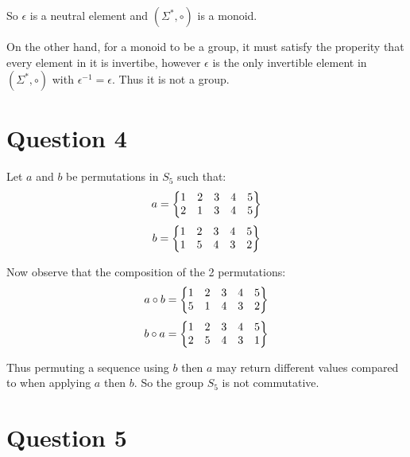 \documentclass{article}
\numberwithin{equation}{subsection}
\begin{document}
	So $\epsilon$ is a neutral element and $(\Sigma^*, \circ)$ is a monoid.

	\vspace{10pt}
	On the other hand, for a monoid to be a group, it must satisfy the properity that every element
	in it is invertibe, however $\epsilon$ is the only invertible element in $(\Sigma^*, \circ)$ with $\epsilon^{-1} = \epsilon$.
	Thus it is not a group.

	\vspace{30pt}
	\section*{Question 4}
	Let $a$ and $b$ be permutations in $S_5$ such that:
	\begin{equation}\notag
		a = \begin{Bmatrix}
					1 & 2 & 3 & 4 & 5 \\
					2 & 1 & 3 & 4 & 5
				\end{Bmatrix}	
	\end{equation}
	\begin{equation}\notag
		b = \begin{Bmatrix}
					1 & 2 & 3 & 4 & 5 \\
					1 & 5 & 4 & 3 & 2
				\end{Bmatrix}
	\end{equation}

	Now observe that the composition of the 2 permutations:
	\begin{equation}\notag
		a \circ b = \begin{Bmatrix}
			1 & 2 & 3 & 4 & 5\\
			5 & 1 & 4 & 3 & 2
		\end{Bmatrix} 	
	\end{equation}
	\begin{equation}\notag
		b \circ a = \begin{Bmatrix}
			1 & 2 & 3 & 4 & 5\\
			2 & 5 & 4 & 3 & 1
		\end{Bmatrix}	
	\end{equation}

	Thus permuting a sequence using $b$ then $a$ may return different values compared to when applying
	$a$ then $b$. So the group $S_5$ is not commutative.


	\newpage
	\thispagestyle{fancy}

	\section*{Question 5}
\end{document}

